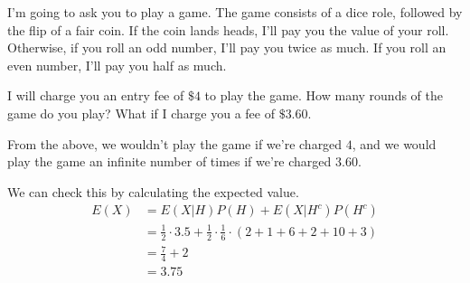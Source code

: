 \documentclass[11pt]{article}
\begin{document}
\begin{exercise}
I'm going to ask you to play a game. The game consists of a dice role, followed by the flip of a fair coin. If the coin lands heads, I'll pay you the value of your roll. Otherwise, if you roll an odd number, I'll pay you twice as much. If you roll an even number, I'll pay you half as much.

I will charge you an entry fee of $\$4$ to play the game. How many rounds of the game do you play? What if I charge you a fee of $\$3.60$.
\end{exercise}

\begin{solution}
From the above, we wouldn't play the game if we're charged $4$, and we would play the game an infinite number of times if we're charged $3.60$.

We can check this by calculating the expected value.
\begin{align*}
E(X) &= E(X|H)P(H) + E(X|H^c)P(H^c) \\
&= \frac{1}{2} \cdot 3.5 + \frac{1}{2} \cdot \frac{1}{6} \cdot (2 + 1 + 6 + 2 + 10 + 3) \\
&= \frac{7}{4} + 2  \\
&= 3.75
\end{align*}
\end{solution}
\end{document}
